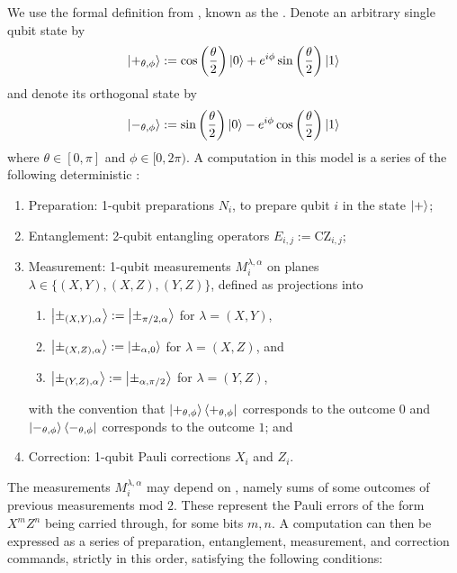 \begin{definition}
\label{def:measurement-calculus}
We use the formal definition from \cite{mbqc-def}, known as the . Denote an arbitrary single qubit state by
\begin{align}
    \ket{+_{\theta,\phi}} 
    := \cos\left(\frac{\theta}{2}\right)\ket{0}
        + e^{i\phi} \sin\left(\frac{\theta}{2}\right)\ket{1}
\end{align}
and denote its orthogonal state by 
\begin{align}
    \ket{-_{\theta,\phi}} 
    := \sin\left(\frac{\theta}{2}\right)\ket{0}
        - e^{i\phi} \cos\left(\frac{\theta}{2}\right)\ket{1}
\end{align}
where $\theta \in [0,\pi]$ and $\phi \in [0,2\pi)$. A computation in this model is a series of the following deterministic :
\begin{enumerate}
    \item Preparation: 1-qubit preparations $N_i$, to prepare qubit $i$ in the state $\ket{+}$;
    \item Entanglement: 2-qubit entangling operators $E_{i,j} := \text{CZ}_{i,j}$;
    \item Measurement: 1-qubit measurements $M_i^{\lambda, \alpha}$ on planes $\lambda \in \{(X,Y), (X,Z), (Y,Z)\}$, defined as projections into
    \begin{enumerate}[label=(\roman*)]
        \item $\ket{\pm_{(X,Y),\alpha}} := \ket{\pm_{\pi/2,\alpha}}$ for $\lambda=(X,Y)$,
        \item $\ket{\pm_{(X,Z),\alpha}} := \ket{\pm_{\alpha,0}}$ for $\lambda=(X,Z)$, and
        \item $\ket{\pm_{(Y,Z),\alpha}} := \ket{\pm_{\alpha,\pi/2}}$ for $\lambda=(Y,Z)$,
    \end{enumerate}
    with the convention that $\ket{+_{\theta,\phi}} \bra{+_{\theta,\phi}}$ corresponds to the outcome $0$ and $\ket{-_{\theta,\phi}} \bra{-_{\theta,\phi}}$ corresponds to the outcome $1$; and
    \item Correction: 1-qubit Pauli corrections $X_i$ and $Z_i$.
\end{enumerate}
The measurements $M_i^{\lambda, \alpha}$ may depend on , namely sums of some outcomes of previous measurements mod $2$. These represent the Pauli errors of the form $X^m Z^n$ being carried through, for some bits $m,n$. A computation can then be expressed as a series of preparation, entanglement, measurement, and correction commands, strictly in this order, satisfying the following conditions:

\end{definition}
